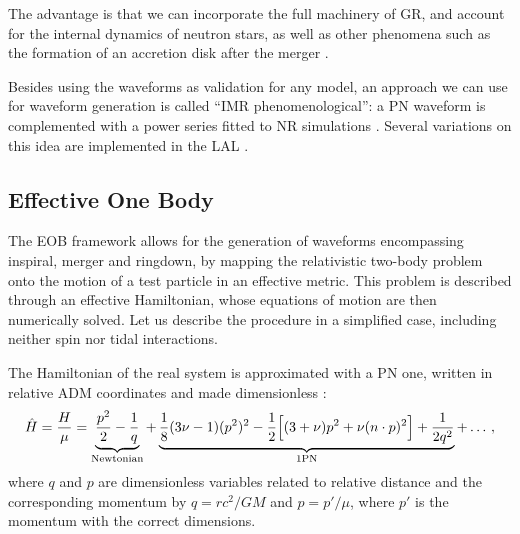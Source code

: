 \documentclass[main.tex]{subfiles}
\begin{document}
The advantage is that we can incorporate the full machinery of \ac{GR}, and account for the internal dynamics of neutron stars, as well as other phenomena such as the formation of an accretion disk after the merger \cite{nedoraNumericalRelativitySimulations2020}.

Besides using the waveforms as validation for any model, 
an approach we can use for waveform generation is called ``\ac{IMR} phenomenological'': a \ac{PN} waveform is complemented with a power series fitted to \ac{NR} simulations \cite{kumarAccuracyPrecisionGravitationalwave2015}. 
Several variations on this idea are implemented in the \ac{LAL} \cite[]{ligoscientificcollaborationLIGOAlgorithmLibrary2018}.

\subsection{Effective One Body} \label{sec:eob}

The \ac{EOB} framework allows for the generation of waveforms encompassing inspiral, merger and ringdown, by mapping the relativistic two-body problem onto the motion of a test particle in an effective metric. 
This problem is described through an effective Hamiltonian, whose equations of motion are then numerically solved. 
Let us describe the procedure in a simplified case, including neither spin nor tidal interactions. 

The Hamiltonian of the real system is approximated with a \ac{PN} one, written in relative \ac{ADM} coordinates and made dimensionless \cite[eqs.\ 4--5]{damourGeneralRelativisticTwo2014}: 
%
\begin{align}
\hat{H} = \frac{H}{\mu } = \underbrace{\frac{p^2}{2} - \frac{1}{q}}_{\text{Newtonian}} 
+ \underbrace{\frac{1}{8} (3 \nu -1 ) (p^2)^2 - \frac{1}{2} \qty[(3+\nu ) p^2 + \nu (n \cdot p)^2] + \frac{1}{2 q^2}}_{\text{1PN}} + \dots
\,,
\end{align}
% 
where \(q\) and \(p\) are dimensionless variables related to relative distance and the corresponding
momentum by \(q = r c^2 / GM\) and \(p = p' / \mu \), where \(p'\) is the momentum with the correct dimensions.  
\end{document}
